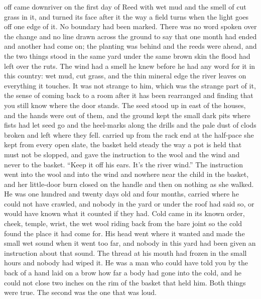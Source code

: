 
 off  came downriver on the first day of Reed with wet mud and the smell of cut grass in it, and  turned its face after it the way a field turns when the light goes off one edge of it. No boundary had been marked. There was no word spoken over the change and no line drawn across the ground to say that one month had ended and another had come on; the planting was behind and the reeds were ahead, and the two things stood in the same yard under the same brown skin the flood had left over the ruts. The wind had a smell he knew before he had any word for it in this country: wet mud, cut grass, and the thin mineral edge the river leaves on everything it touches. It was not strange to him, which was the strange part of it, the sense of coming back to a room after it has been rearranged and finding that you still know where the door stands. The seed stood up in  east of the houses, and the hands were out of them, and the ground kept the small dark pits where fists had let seed go and the heel-marks along the drills and the pale dust of clods broken and left where they fell.  carried  up from the rack end at the half-pace she kept from every open slate, the basket held steady the way a pot is held that must not be slopped, and gave the instruction to the wool and the wind and never to the basket. “Keep it off his ears. It's the river wind.” The instruction went into the wool and into the wind and nowhere near the child in the basket, and her little-door burn closed on the handle and then on nothing as she walked. He was one hundred and twenty days old and four months, carried where he could not have crawled, and nobody in the yard or under the roof had said so, or would have known what it counted if they had. Cold came in its known order, cheek, temple, wrist, the wet wool riding back from the bare joint so the cold found the place it had come for. His head went where it wanted and made the small wet sound when it went too far, and nobody in this yard had been given an instruction about that sound. The thread at his mouth had frozen in the small hours and nobody had wiped it. He was a man who could have told you by the back of a hand laid on a brow how far a body had gone into the cold, and he could not close two inches on the rim of the basket that held him. Both things were true. The second was the one that was loud.

